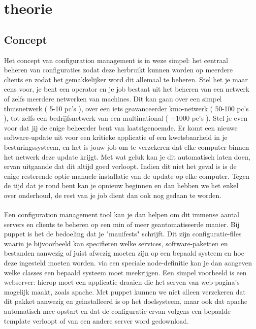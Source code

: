 \chapter{theorie}

\section{Concept}
Het concept van configuration management is in weze simpel: het centraal beheren van configuraties zodat deze herbruikt kunnen worden op meerdere clients en zodat het gemakkelijker word dit allemaal te beheren. Stel het je maar eens voor, je bent een operator en je job bestaat uit het beheren van een netwerk of zelfs meerdere netwerken van machines. Dit kan gaan over een simpel thuisnetwerk ( 5-10 pc's ), over een iets geavanceerder kmo-netwerk ( 50-100 pc's ), tot zelfs een bedrijfsnetwerk van een multinational ( +1000 pc's ). Stel je even voor dat jij de enige beheerder bent van laatstgenoemde. Er komt een nieuwe software-update uit voor een kritieke applicatie of een kwetsbaarheid in je besturingssysteem, en het is jouw job om te verzekeren dat elke computer binnen het netwerk deze update krijgt. Met wat geluk kan je dit automatisch laten doen, ervan uitgaande dat dit altijd goed verloopt. Indien dit niet het geval is is de enige resterende optie manuele installatie van de update op elke computer. Tegen de tijd dat je rond bent kan je opnieuw beginnen en dan hebben we het enkel over onderhoud, de rest van je job dient dan ook nog gedaan te worden.\\\\
Een configuration management tool kan je dan helpen om dit immense aantal servers en clients te beheren op een min of meer geautomatiseerde manier. Bij puppet is het de bedoeling dat je "manifests" schrijft. Dit zijn configuratie-files waarin je bijvoorbeeld kan specifieren welke services, software-paketten en bestanden aanwezig of juist afwezig moeten zijn op een bepaald systeem en hoe deze ingesteld moeten worden. via een speciale node-definitie kan je dan aangeven welke classes een bepaald systeem moet meekrijgen. Een simpel voorbeeld is een webserver: hierop moet een applicatie draaien die het serven van web-pagina's mogelijk maakt, zoals apache. Met puppet kunnen we niet alleen verzekeren dat dit pakket aanwezig en geinstalleerd is op het doelsysteem, maar ook dat apache automatisch mee opstart en dat de configuratie ervan volgens een bepaalde template verloopt of van een andere server word gedownload.\\\\
